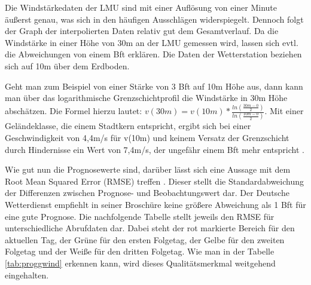 Die Windstärkedaten der LMU sind mit einer Auflösung von einer Minute äußerst genau, was sich in den häufigen Ausschlägen widerspiegelt. Dennoch folgt der Graph der interpolierten Daten relativ gut dem Gesamtverlauf. Da die Windstärke in einer Höhe von 30m an der LMU gemessen wird, lassen sich evtl. die Abweichungen von einem Bft erklären. Die Daten der Wetterstation beziehen sich auf 10m über dem Erdboden. 

Geht man zum Beispiel von einer Stärke von 3 Bft auf 10m Höhe aus, dann kann man über das logarithmische Grenzschichtprofil die Windstärke in 30m Höhe abschätzen. Die Formel hierzu lautet: \(v(30m) = v(10m)*\frac{ln(\frac{30m-0}{2})}{ln(\frac{10m-0}{2})}\). Mit einer Geländeklasse, die einem Stadtkern entspricht, ergibt sich bei einer Geschwindigkeit von 4,4m/s für v(10m) und keinem Versatz der Grenzschicht durch Hindernisse ein Wert von 7,4m/s, der ungefähr einem Bft mehr entspricht \cite{GrenzProf}.

Wie gut nun die Prognosewerte sind, darüber lässt sich eine Aussage mit dem Root Mean Squared Error (RMSE) treffen \cite{DWD}. Dieser stellt die Standardabweichung der Differenzen zwischen Prognose- und Beobachtungswert dar. Der Deutsche Wetterdienst empfiehlt in seiner Broschüre keine größere Abweichung als 1 Bft für eine gute Prognose. Die nachfolgende Tabelle stellt jeweils den RMSE für unterschiedliche Abrufdaten dar. Dabei steht der rot markierte Bereich für den aktuellen Tag, der Grüne für den ersten Folgetag, der Gelbe für den zweiten Folgetag und der Weiße für den dritten Folgetag. Wie man in der Tabelle \ref{tab:proggwind} erkennen kann, wird dieses Qualitätsmerkmal weitgehend eingehalten. 
